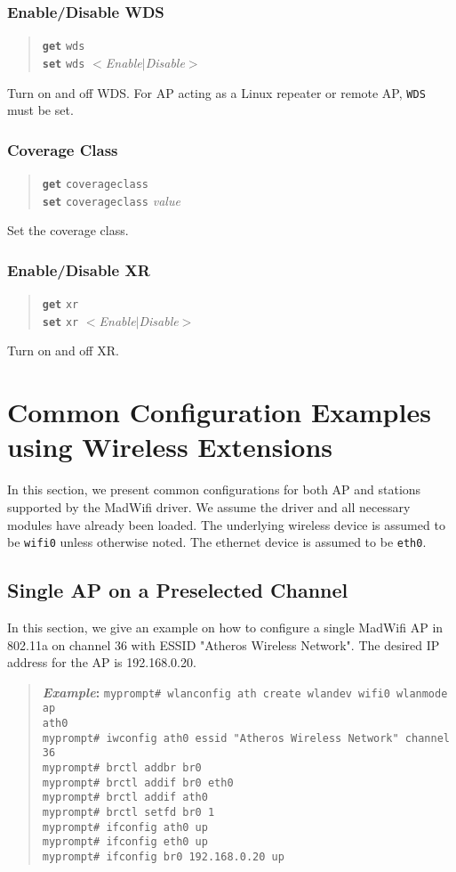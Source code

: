 \documentclass[10pt,fullpage]{article}
\newcommand{\mytt}[1]{{\texttt{#1}}}
\newcommand{\bv}{\begin{verse}}
\newcommand{\ev}{\end{verse}}
\newcommand{\cmd}[1]{{\texttt{myprompt\# #1}}}
\newcommand{\clicmd}[1]{{\textbf{\texttt{#1}}}}
\newcommand{\cliparam}[1]{{\texttt{#1}}}
\newcommand{\clival}[1]{{\emph{#1}}}
\newenvironment{example}{\begin{quote}\textbf{\textit{Example}:}}{\end{quote}}
\begin{document}
\subsubsection{Enable/Disable WDS}
\bv
\clicmd{get} \cliparam{wds}\\
\clicmd{set} \cliparam{wds} $<$\clival{Enable}$|$\clival{Disable}$>$
\ev
Turn on and off WDS. For AP acting as a Linux repeater or remote AP,
\cliparam{WDS} must be set.

\subsubsection{Coverage Class}
\bv
\clicmd{get} \cliparam{coverageclass}\\
\clicmd{set} \cliparam{coverageclass} \clival{value}
\ev
Set the coverage class.

\subsubsection{Enable/Disable XR}
\bv
\clicmd{get} \cliparam{xr}\\
\clicmd{set} \cliparam{xr} $<$\clival{Enable}$|$\clival{Disable}$>$
\ev
Turn on and off XR.

\section{Common Configuration Examples using Wireless Extensions}
In this section, we present common configurations for both AP and
stations supported by the MadWifi driver.  We assume the driver and
all necessary modules have already been loaded.  The underlying
wireless device is assumed to be \mytt{wifi0} unless otherwise noted.
The ethernet device is assumed to be \mytt{eth0}.


\subsection{Single AP on a Preselected Channel}
In this section, we give an example on how to configure a single
MadWifi AP in 802.11a on channel 36 with ESSID "Atheros Wireless
Network". The desired IP address for the AP is 192.168.0.20.
\begin{example}
  \cmd{wlanconfig ath create wlandev wifi0 wlanmode ap}\\
  \mytt{ath0}\\
  \cmd{iwconfig ath0 essid "Atheros Wireless Network" channel 36}\\
  \cmd{brctl addbr br0}\\
  \cmd{brctl addif br0 eth0}\\
  \cmd{brctl addif ath0}\\
  \cmd{brctl setfd br0 1}\\
  \cmd{ifconfig ath0 up}\\
  \cmd{ifconfig eth0 up}\\
  \cmd{ifconfig br0 192.168.0.20 up}
\end{example}
\end{document}
